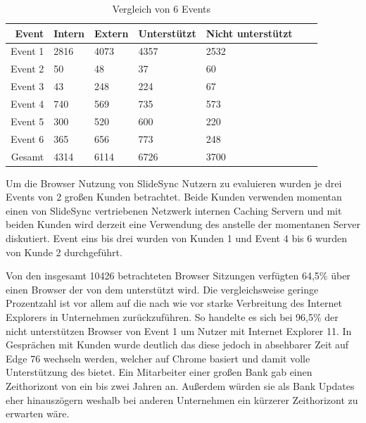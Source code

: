 \begin{table}[!htb]\label{table-browser-slidesync}
\begin{center}

	\begin{tabular}{|r|l|l|l|l|l|l|}
		\hline
		Event	 & Intern 	& Extern 	& Unterstützt & Nicht unterstützt \\ \hline
		Event 1	 & 2816		& 4073	  	& 4357		  & 2532		\\ \hline 
		Event 2	 & 50		& 48		 	& 37			  & 60		\\ \hline 
		Event 3	 & 43		& 248	  	& 224		  & 67		\\ \hline 
		Event 4	 & 740		& 569	  	& 735		  & 573		\\ \hline 
		Event 5	 & 300		& 520	  	& 600		  & 220		\\ \hline 
		Event 6	 & 365		& 656	  	& 773		  & 248		\\ \hline 
		Gesamt	 & 4314		& 6114	  	& 6726		  & 3700		\\ \hline 

	\end{tabular}
	\caption{Vergleich von 6 Events}
\end{center}

\end{table}

Um die Browser Nutzung von SlideSync Nutzern zu evaluieren wurden je drei Events von 2 großen Kunden betrachtet. Beide Kunden verwenden momentan einen von SlideSync vertriebenen Netzwerk internen Caching Servern und mit beiden Kunden wird derzeit eine Verwendung des \pTp \cdns anstelle der momentanen \cdn Server diskutiert. Event eins bis drei wurden von Kunden 1 und Event 4 bis 6 wurden von Kunde 2 durchgeführt. 

 Von den insgesamt 10426 betrachteten Browser Sitzungen verfügten 64,5\% über einen Browser der von dem \pTp \cdn unterstützt wird. Die vergleichsweise geringe Prozentzahl ist vor allem auf die nach wie vor starke Verbreitung des Internet Explorers in Unternehmen zurückzuführen. So handelte es sich bei 96,5\% der nicht unterstützen Browser von Event 1 um Nutzer mit Internet Explorer 11. In Gesprächen mit Kunden wurde deutlich das diese jedoch in absehbarer Zeit auf Edge 76 wechseln werden, welcher auf Chrome basiert und damit volle Unterstützung des \cdns bietet.\cite{edge-chrome} Ein Mitarbeiter einer großen Bank gab einen Zeithorizont von ein bis zwei Jahren an. Außerdem würden sie als Bank Updates eher hinauszögern weshalb bei anderen Unternehmen ein kürzerer Zeithorizont zu erwarten wäre.


